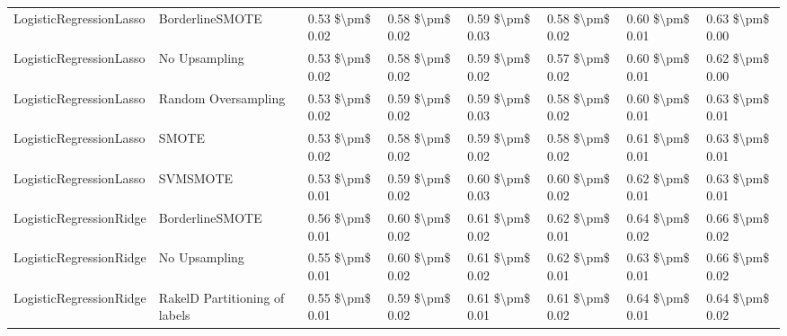 \begin{tabular}{llllllll}
        LogisticRegressionLasso &               BorderlineSMOTE & 0.53 \$\textbackslash pm\$ 0.02 &           0.58 \$\textbackslash pm\$ 0.02 &       0.59 \$\textbackslash pm\$ 0.03 &        0.58 \$\textbackslash pm\$ 0.02 &                         0.60 \$\textbackslash pm\$ 0.01 &     0.63 \$\textbackslash pm\$ 0.00 \\
        LogisticRegressionLasso &                 No Upsampling & 0.53 \$\textbackslash pm\$ 0.02 &           0.58 \$\textbackslash pm\$ 0.02 &       0.59 \$\textbackslash pm\$ 0.02 &        0.57 \$\textbackslash pm\$ 0.02 &                         0.60 \$\textbackslash pm\$ 0.01 &     0.62 \$\textbackslash pm\$ 0.00 \\
        LogisticRegressionLasso &           Random Oversampling & 0.53 \$\textbackslash pm\$ 0.02 &           0.59 \$\textbackslash pm\$ 0.02 &       0.59 \$\textbackslash pm\$ 0.03 &        0.58 \$\textbackslash pm\$ 0.02 &                         0.60 \$\textbackslash pm\$ 0.01 &     0.63 \$\textbackslash pm\$ 0.01 \\
        LogisticRegressionLasso &                         SMOTE & 0.53 \$\textbackslash pm\$ 0.02 &           0.58 \$\textbackslash pm\$ 0.02 &       0.59 \$\textbackslash pm\$ 0.02 &        0.58 \$\textbackslash pm\$ 0.02 &                         0.61 \$\textbackslash pm\$ 0.01 &     0.63 \$\textbackslash pm\$ 0.01 \\
        LogisticRegressionLasso &                      SVMSMOTE & 0.53 \$\textbackslash pm\$ 0.01 &           0.59 \$\textbackslash pm\$ 0.02 &       0.60 \$\textbackslash pm\$ 0.03 &        0.60 \$\textbackslash pm\$ 0.02 &                         0.62 \$\textbackslash pm\$ 0.01 &     0.63 \$\textbackslash pm\$ 0.01 \\
        LogisticRegressionRidge &               BorderlineSMOTE & 0.56 \$\textbackslash pm\$ 0.01 &           0.60 \$\textbackslash pm\$ 0.02 &       0.61 \$\textbackslash pm\$ 0.02 &        0.62 \$\textbackslash pm\$ 0.01 &                         0.64 \$\textbackslash pm\$ 0.02 &     0.66 \$\textbackslash pm\$ 0.02 \\
        LogisticRegressionRidge &                 No Upsampling & 0.55 \$\textbackslash pm\$ 0.01 &           0.60 \$\textbackslash pm\$ 0.02 &       0.61 \$\textbackslash pm\$ 0.02 &        0.62 \$\textbackslash pm\$ 0.01 &                         0.63 \$\textbackslash pm\$ 0.01 &     0.66 \$\textbackslash pm\$ 0.02 \\
        LogisticRegressionRidge & RakelD Partitioning of labels & 0.55 \$\textbackslash pm\$ 0.01 &           0.59 \$\textbackslash pm\$ 0.02 &       0.61 \$\textbackslash pm\$ 0.01 &        0.61 \$\textbackslash pm\$ 0.02 &                         0.64 \$\textbackslash pm\$ 0.01 &     0.64 \$\textbackslash pm\$ 0.02 \\

\end{tabular}
